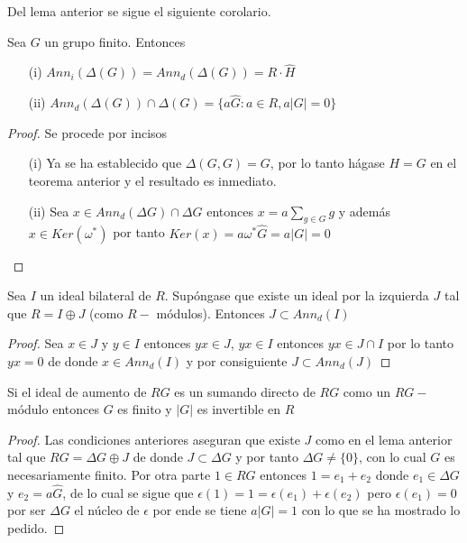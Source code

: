 Del lema anterior se sigue el siguiente corolario.

\begin{corolario}
Sea $G$ un grupo finito. Entonces 

\begin{itemize}
\item[(i)] $Ann_i (\Delta(G)) = Ann_d(\Delta(G)) = R\cdot \hat{H}$
\item[(ii)] $Ann_d(\Delta(G)) \cap \Delta (G) = \{ a\hat{G} : a \in R , a|G| = 0\}$ 
\end{itemize}
\end{corolario}


\begin{proof}
Se procede por incisos
\begin{itemize}
\item[(i)] Ya se ha establecido que $\Delta(G,G) = G$, por lo tanto hágase $H=G$ en el teorema anterior y el resultado es inmediato.
\item[(ii)] Sea $x \in Ann_d(\Delta G) \cap \Delta G$ entonces $x = a\sum_{g\in G}g$ y además $x \in Ker(\omega^*)$ por tanto $Ker(x)= a\omega^*\hat{G} = a|G| = 0 $ \qedhere
\end{itemize}
\end{proof}


\begin{lema}
Sea $I$ un ideal bilateral de $R$. Supóngase que existe un ideal por la izquierda $J$ tal que $R = I \oplus J$ (como $R-$ módulos). Entonces $J \subset Ann_d(I) $
\end{lema}

\begin{proof}
Sea $x \in J$ y $y \in I $ entonces $yx \in J$, $yx \in I$ entonces $yx \in J\cap I$ por lo tanto $yx=0$ de donde $x \in Ann_d(I)$ y por consiguiente $J \subset Ann_d(J)$ \qedhere 
\end{proof}

\begin{lema}\label{aumento}
Si el ideal de aumento de $RG$ es un sumando directo de $RG$ como un $RG-$módulo entonces $G$ es finito y $|G|$ es invertible en $R$
\end{lema}

\begin{proof}
Las condiciones anteriores aseguran que existe $J$ como en el lema anterior tal que $RG = \Delta G \oplus J$ de donde $J \subset \Delta G$  y por tanto $\Delta G \neq \{ 0 \}$, con lo cual $G$ es necesariamente finito.
Por otra parte $1 \in RG$ entonces $1 = e_1 + e_2$ donde $e_1 \in \Delta G$ y $e_2=a\hat{G}$, de lo cual se sigue que $\epsilon(1) = 1 = \epsilon(e_1) + \epsilon(e_2)$ pero $\epsilon(e_1) = 0$ por ser $\Delta G$ el núcleo de $\epsilon$ por ende se tiene $a|G| = 1$ con lo que se ha mostrado lo pedido. \qedhere
\end{proof}

